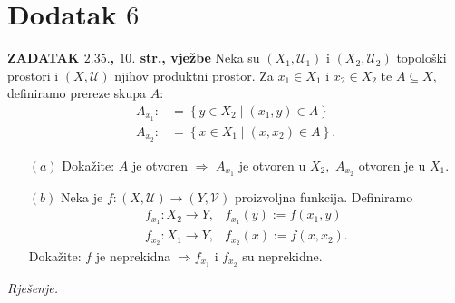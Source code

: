 \documentclass{article}
\begin{document}
\section{Dodatak \(6\)}
\textbf{ZADATAK \(2.35.\), \(10.\) str., vježbe}\newline
Neka su \(\left(X_1,\mathcal U_1\right)\) i \(\left(X_2,\mathcal U_2\right)\) topološki prostori i \((X,\mathcal U)\) njihov produktni prostor. Za \(x_1\in X_1\) i \(x_2\in X_2\) te \(A\subseteq X,\) definiramo prereze skupa \(A\): \[\begin{aligned}A_{x_1}:&=\left\{y\in X_2\mid (x_1,y)\in A\right\}\\A_{x_2}:&=\left\{x\in X_1\mid (x,x_2)\in A\right\}.\end{aligned}\] 
\begin{enumerate}
    \item[\((a)\)] Dokažite: \(A\) je otvoren \(\Rightarrow\) \(A_{x_1}\) je otvoren u \(X_2,\) \(A_{x_2}\) otvoren je u \(X_1.\)
    \item[\((b)\)] Neka je \(f:(X,\mathcal U)\to(Y,\mathcal V)\) proizvoljna funkcija. Definiramo \[\begin{matrix}f_{x_1}:X_2\to Y,&f_{x_1}(y):=f(x_1,y)\\f_{x_2}:X_1\to Y,&f_{x_2}(x):=f(x,x_2).\end{matrix}\] Dokažite: \(f\) je neprekidna \(\Rightarrow f_{x_1}\) i \(f_{x_2}\) su neprekidne. 
\end{enumerate}
\textit{Rješenje.}
\end{document}
